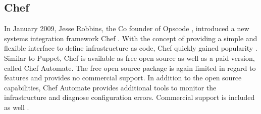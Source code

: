 %			
%			
%			


\subsection{Chef}

In January 2009, Jesse Robbins, the Co founder of Opscode \cite{mittechreviewrobbins}, introduced a new systems integration framework Chef \cite{chefcomannouncement}. With the concept of providing a simple and flexible interface to define infrastructure as code, Chef quickly gained popularity \cite{pandey2012investigating}.
Similar to Puppet, Chef is available as free open source as well as a paid version, called Chef Automate. The free open source package is again limited in regard to features and provides no commercial support. In addition to the open source capabilities, Chef Automate provides additional tools to monitor the infrastructure and diagnose configuration errors. Commercial support is included as well \cite{chefiodatasheet}.

